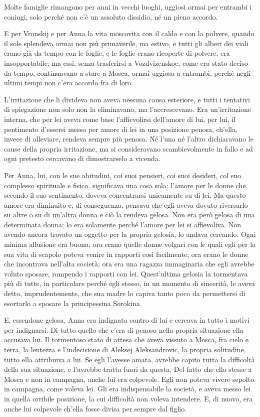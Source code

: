 Molte famiglie rimangono per anni in vecchi luoghi, uggiosi ormai per entrambi i coniugi, solo perché non c'è un assoluto dissidio, né un pieno accordo. 

E per Vronskij e per Anna la vita moscovita con il caldo e con la polvere, quando il sole splendeva ormai non più primaverile, ma estivo, e tutti gli alberi dei viali erano già da tempo con le foglie, e le foglie erano ricoperte di polvere, era insopportabile; ma essi, senza trasferirsi a Vozdvizenskoe, come era stato deciso da tempo, continuavano a stare a Mosca, ormai uggiosa a entrambi, perché negli ultimi tempi non c'era accordo fra di loro. 

L'irritazione che li divideva non aveva nessuna causa esteriore, e tutti i tentativi di spiegazione non solo non la eliminavano, ma l'accrescevano. Era un'irritazione interna, che per lei aveva come base l'affievolirsi dell'amore di lui, per lui, il pentimento d'essersi messo per amore di lei in una posizione penosa, ch'ella, invece di alleviare, rendeva sempre più penosa. Né l'una né l'altro dichiaravano le cause della propria irritazione, ma si consideravano scambievolmente in fallo e ad ogni pretesto cercavano di dimostrarselo a vicenda. 

Per Anna, lui, con le sue abitudini, coi suoi pensieri, coi suoi desideri, col suo complesso spirituale e fisico, significava una cosa sola: l'amore per le donne che, secondo il suo sentimento, doveva concentrarsi unicamente su di lei. Ma questo amore era diminuito e, di conseguenza, pensava che egli aveva dovuto riversarlo su altre o su di un'altra donna e ciò la rendeva gelosa. Non era però gelosa di una determinata donna; lo era solamente perché l'amore per lei si affievoliva. Non avendo ancora trovato un oggetto per la propria gelosia, lo andava cercando. Ogni minima allusione era buona; ora erano quelle donne volgari con le quali egli per la sua vita di scapolo poteva venire in rapporti così facilmente; ora erano le donne che incontrava nell'alta società; ora era una ragazza immaginaria che egli avrebbe voluto sposare, rompendo i rapporti con lei. Quest'ultima gelosia la tormentava più di tutte, in particolare perché egli stesso, in un momento di sincerità, le aveva detto, imprudentemente, che sua madre lo capiva tanto poco da permettersi di esortarlo a sposare la principessina Sorokina. 

E, essendone gelosa, Anna era indignata contro di lui e cercava in tutto i motivi per indignarsi. Di tutto quello che c'era di penoso nella propria situazione ella accusava lui. Il tormentoso stato di attesa che aveva vissuto a Mosca, fra cielo e terra, la lentezza e l'indecisione di Aleksej Aleksandrovic, la propria solitudine, tutto ella attribuiva a lui. Se egli l'avesse amata, avrebbe capito tutta la difficoltà della sua situazione, e l'avrebbe tratta fuori da questa. Del fatto che ella stesse a Mosca e non in campagna, anche lui era colpevole. Egli non poteva vivere sepolto in campagna, come voleva lei. Gli era indispensabile la società, e aveva messo lei in quella orribile posizione, la cui difficoltà non voleva intendere. E, di nuovo, era anche lui colpevole ch'ella fosse divisa per sempre dal figlio. 

